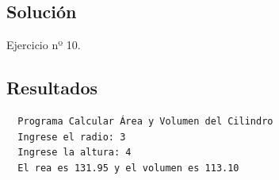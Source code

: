 \subsection{Solución}
\begin{longlisting}
	\caption{Ejercicio nº 10.}\label{cod:ex_10}
\end{longlisting}
\subsection{Resultados}
\begin{verbatim}
  Programa Calcular Área y Volumen del Cilindro
  Ingrese el radio: 3
  Ingrese la altura: 4
  El rea es 131.95 y el volumen es 113.10
\end{verbatim}